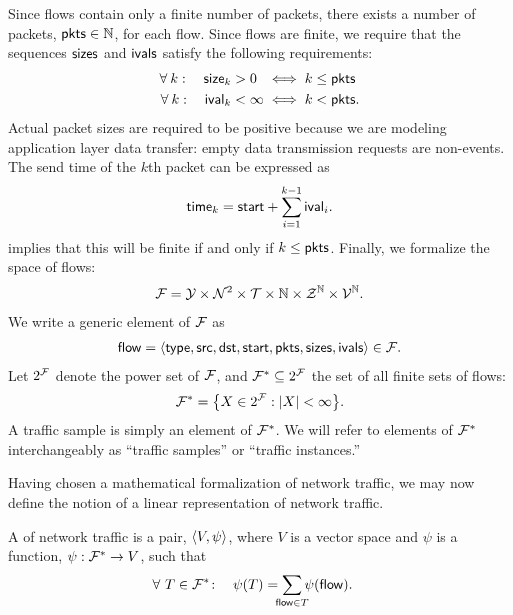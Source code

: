 \documentclass[twocolumn,final]{svjour3}
\begin{document}
Since flows contain only a finite number of packets, there exists a number of packets, $\text{\textsf{pkts}} \in \mathbb{N}$, for each flow. Since flows are finite, we require that the sequences $\text{\textsf{sizes}}$ and $\text{\textsf{ivals}}$ satisfy the following requirements:
\begin{align}
\forall\: k: \quad
  \size_k >  \mathrlap{0} \phantom{\infty}
  &\iff k \le \pkts
  \eqn{packet-positivity} \\
\forall\: k: \quad
  \ival_k < \infty
  &\iff k < \pkts.
  \eqn{interval-finiteness}
\end{align}
Actual packet sizes are required to be positive because we are modeling application layer data transfer:
empty data transmission requests are non-events.
The send time of the $k$th packet can be expressed as
\begin{align}
\text{\textsf{time}}_k = \text{\textsf{start}} + \sum_{i=1}^{k-1} \text{\textsf{ival}}_i.
\end{align}
 implies that this will be finite if and only if $k \le \text{\textsf{pkts}}$.
Finally, we formalize the space of flows:
\begin{align}
  \mathcal{F} =
    \mathcal{Y}    \times
    \mathcal{N}^2  \times
    \mathcal{T}    \times
    \mathbb{N}        \times
    \mathcal{Z}^{\mathbb{N}}  \times
    \mathcal{V}^{\mathbb{N}}.
\end{align}
We write a generic element of $\mathcal{F}$ as
\begin{align}
  \text{\textsf{flow}} = {\left<
    \text{\textsf{type}},
    \text{\textsf{src}},
    \text{\textsf{dst}},
    \text{\textsf{start}},
    \text{\textsf{pkts}},
    \text{\textsf{sizes}},
    \text{\textsf{ivals}}
  \right>} \in \mathcal{F}.
\end{align}
Let $2^{\mathcal{F}}$ denote the power set of $\mathcal{F}$, and $\mathcal{F}^* \subseteq 2^{\mathcal{F}}$ the set of all finite sets of flows:
\begin{align}
  \mathcal{F}^* = {\left\{X \in 2^{\mathcal{F}} : {\left|X\right|} < \infty\right\}}.
\end{align}
A traffic sample is simply an element of $\mathcal{F}^*$. We will refer to elements of $\mathcal{F}^*$ interchangeably as ``traffic samples'' or ``traffic instances.''

Having chosen a mathematical formalization of network traffic, we may now define the notion of a linear representation of network traffic.

\begin{definition}
A  of network traffic is a pair, ${\left<V,\psi\right>}$, where $V$ is a vector space and $\psi$ is a function, $\psi: \mathcal{F}^* \to V$, such that
\begin{align}\eqn{linearity}
\forall~T \in \Traffic\!:\quad
  \psi(T) &= \sum_{\mathclap{\flow \in T}}{\psi(\flow)}.
\end{align}
\end{definition}
\end{document}
